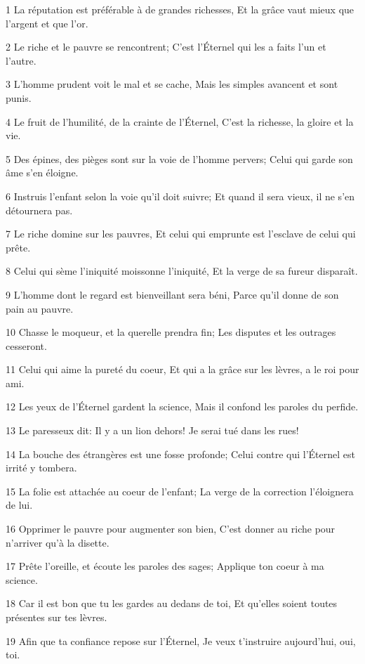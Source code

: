 \par 1 La réputation est préférable à de grandes richesses, Et la grâce vaut mieux que l'argent et que l'or.
\par 2 Le riche et le pauvre se rencontrent; C'est l'Éternel qui les a faits l'un et l'autre.
\par 3 L'homme prudent voit le mal et se cache, Mais les simples avancent et sont punis.
\par 4 Le fruit de l'humilité, de la crainte de l'Éternel, C'est la richesse, la gloire et la vie.
\par 5 Des épines, des pièges sont sur la voie de l'homme pervers; Celui qui garde son âme s'en éloigne.
\par 6 Instruis l'enfant selon la voie qu'il doit suivre; Et quand il sera vieux, il ne s'en détournera pas.
\par 7 Le riche domine sur les pauvres, Et celui qui emprunte est l'esclave de celui qui prête.
\par 8 Celui qui sème l'iniquité moissonne l'iniquité, Et la verge de sa fureur disparaît.
\par 9 L'homme dont le regard est bienveillant sera béni, Parce qu'il donne de son pain au pauvre.
\par 10 Chasse le moqueur, et la querelle prendra fin; Les disputes et les outrages cesseront.
\par 11 Celui qui aime la pureté du coeur, Et qui a la grâce sur les lèvres, a le roi pour ami.
\par 12 Les yeux de l'Éternel gardent la science, Mais il confond les paroles du perfide.
\par 13 Le paresseux dit: Il y a un lion dehors! Je serai tué dans les rues!
\par 14 La bouche des étrangères est une fosse profonde; Celui contre qui l'Éternel est irrité y tombera.
\par 15 La folie est attachée au coeur de l'enfant; La verge de la correction l'éloignera de lui.
\par 16 Opprimer le pauvre pour augmenter son bien, C'est donner au riche pour n'arriver qu'à la disette.
\par 17 Prête l'oreille, et écoute les paroles des sages; Applique ton coeur à ma science.
\par 18 Car il est bon que tu les gardes au dedans de toi, Et qu'elles soient toutes présentes sur tes lèvres.
\par 19 Afin que ta confiance repose sur l'Éternel, Je veux t'instruire aujourd'hui, oui, toi.
